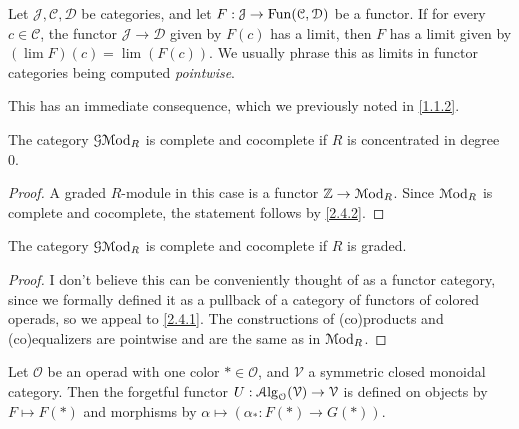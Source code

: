 \begin{proposition}\label{2.4.2}
	Let $\mathcal{J} ,\mathcal{C} ,\mathcal{D} $ be categories, and let $F : \mathcal{J}  \to \operatorname{Fun}(\mathcal{C} , \mathcal{D} ) $ be a functor. If for every $c\in \mathcal{C} $, the functor $\mathcal{J} \to \mathcal{D} $ given by $F(c)$ has a limit, then $F$ has a limit given by $(\lim F)(c) = \lim (F(c))$. We usually phrase this as limits in functor categories being computed \emph{pointwise}.
\end{proposition}

This has an immediate consequence, which we previously noted in \cref{1.1.2}.

\begin{proposition}\label{2.4.3}
	The category $\mathcal{G} \mathcal{M}\mathrm{od} _R$ is complete and cocomplete if $R$ is concentrated in degree 0.
\end{proposition}
\begin{proof}
	A graded $R$-module in this case is a functor $\mathbb{Z} \to \mathcal{M}\mathrm{od} _R$. Since $\mathcal{M}\mathrm{od} _R$ is complete and cocomplete, the statement follows by \cref{2.4.2}.
\end{proof}

\begin{proposition}\label{2.4.4}
	The category $\mathcal{G} \mathcal{M}\mathrm{od} _R$ is complete and cocomplete if $R$ is graded.
\end{proposition}
\begin{proof}
	I don't believe this can be conveniently thought of as a functor category, since we formally defined it as a pullback of a category of functors of colored operads, so we appeal to \cref{2.4.1}. The constructions of (co)products and (co)equalizers are pointwise and are the same as in $\mathcal{M}\mathrm{od}_R$.
\end{proof}

\begin{definition}\label{2.4.5}
	Let $\mathcal{O} $ be an operad with one color $*\in \mathcal{O} $, and $\mathcal{V} $ a symmetric closed monoidal category. Then the forgetful functor $U : \mathcal{A}\mathrm{lg}_{\mathcal{O} } (\mathcal{V} ) \to \mathcal{V} $ is defined on objects by $F\mapsto F(*)$ and morphisms by $\alpha \mapsto (\alpha _*: F(*) \to G(*)) $.
\end{definition}

